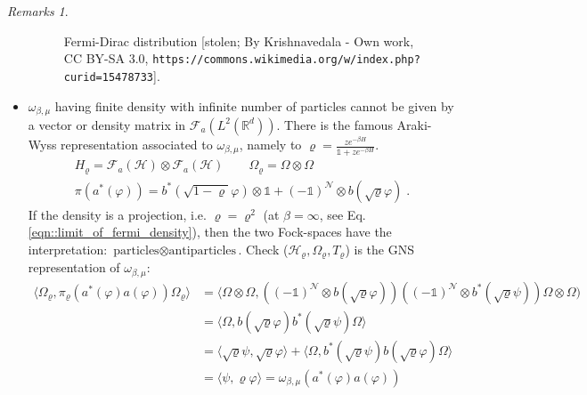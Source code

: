 \documentclass[
a4paper, %
11pt, %
onecolumn, %
openany, %
]{memoir}
\theoremstyle{definition}
\theoremstyle{remark}
\newtheorem{remarks}{Remarks}[chapter]
\theoremstyle{plain}
\begin{document}
\begin{remarks}
\begin{itemize}
\begin{figure}
		 	\caption{Fermi-Dirac distribution [stolen; By Krishnavedala - Own work, CC BY-SA 3.0, \texttt{https://commons.wikimedia.org/w/index.php?curid=15478733}]\label{fermidirac}.}
		 \end{figure}
	 \item $\omega_{\beta,\mu}$ having finite density with infinite number of particles cannot be given by a vector or density matrix in $\mathcal{F}_a(L^2(\mathbb{R}^d))$. There is the famous Araki-Wyss representation associated to $\omega_{\beta,\mu}$, namely to $\varrho=\frac{ze^{-\beta H}}{\mathds{1}+ze^{-\beta H}}$. \begin{align}
	 H_{\varrho}=\mathcal{F}_a (\mathcal{H}) \otimes \mathcal{F}_a(\mathcal{H}) \qquad \Omega_{\varrho}=\Omega\otimes\Omega \\
	 \pi(a^*(\varphi))=b^*(\sqrt{1-\varrho}\varphi)\otimes \mathds{1}+(-\mathds{1})^{\mathcal{N}}\otimes b(\sqrt{\varrho}\varphi)\; .
	 \end{align}
	 If the density is a projection, i.e. $\varrho=\varrho^2$ (at $\beta=\infty$, see Eq. \eqref{eqn::limit_of_fermi_density}), then the two Fock-spaces have the interpretation: $\text{particles}\otimes\text{antiparticles}$. Check ($\mathcal{H}_\varrho,\Omega_{\varrho},T_{\varrho}$) is the GNS representation of $\omega_{\beta,\mu}$: \begin{align}
	 \langle \Omega_{\varrho},\pi_{\varrho}(a^*(\varphi)a(\varphi))\Omega_{\varrho}\rangle&=\langle \Omega\otimes \Omega,\left((-\mathds{1})^{\mathcal{N}}\otimes b(\sqrt{\varrho}\varphi)\right)\left((-\mathds{1})^{\mathcal{N}}\otimes b^*(\sqrt{\varrho}\psi)\right)\Omega\otimes \Omega)\\
	 &=\langle \Omega,b(\sqrt{\varrho}\varphi)b^*(\sqrt{\varrho}\psi)\Omega\rangle\\
	 &=\langle \sqrt{\varrho}\psi,\sqrt{\varrho}\varphi\rangle+\langle \Omega ,b^*(\sqrt{\varrho}\psi)b(\sqrt{\varrho}\varphi)\Omega\rangle\\
	 &=\langle \psi,\varrho\varphi\rangle=\omega_{\beta,\mu}(a^*(\varphi)a(\varphi))
	 \end{align}
	\end{itemize}
\end{remarks}
\end{document}
